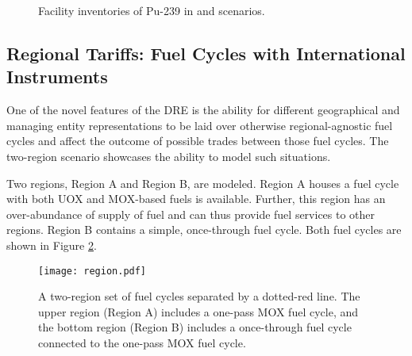 \begin{figure}
  \centering
  \begin{minipage}{0.67\textwidth}
    \centering 
    \vfill 
  \end{minipage}%
  \begin{minipage}{0.33\textwidth}
    \centering
  \end{minipage}%
  \caption[]{
    \label{fig:military}
    Facility inventories of Pu-239 in \basecase and \external scenarios.}
\end{figure}

\subsection{Regional Tariffs: Fuel Cycles with International Instruments}

One of the novel features of the DRE is the ability for different geographical
and managing entity representations to be laid over otherwise regional-agnostic
fuel cycles and affect the outcome of possible trades between those fuel
cycles. The \tariff two-region scenario showcases the ability to model
such situations.

Two regions, Region A and Region B, are modeled. Region A houses a fuel cycle
with both UOX and MOX-based fuels is available. Further, this region has an
over-abundance of supply of fuel and can thus provide fuel services to other
regions. Region B contains a simple, once-through fuel cycle. Both fuel cycles
are shown in Figure \ref{fig:region}.

\begin{figure}
  \begin{center}
    \texttt{[image: region.pdf]}
    \caption[]{
      \label{fig:region}
      A two-region set of fuel cycles separated by a dotted-red line. The upper
      region (Region A) includes a one-pass MOX fuel cycle, and the bottom
      region (Region B) includes a once-through fuel cycle connected to the
      one-pass MOX fuel cycle.}
  \end{center}
\end{figure}

